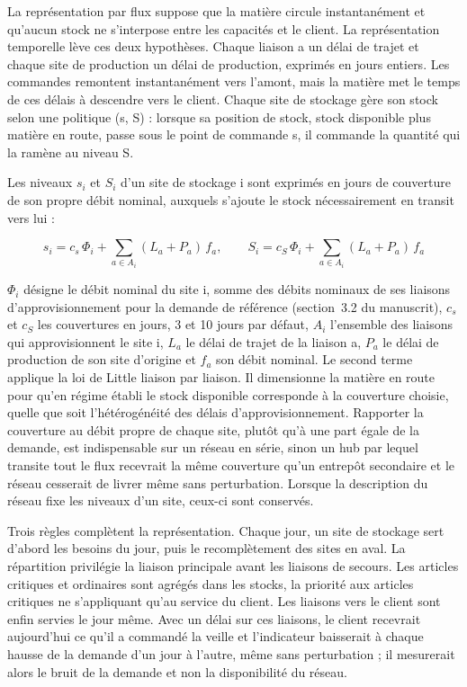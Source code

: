 La représentation par flux suppose que la matière circule instantanément et qu'aucun stock ne s'interpose entre les capacités et le client. La représentation temporelle lève ces deux hypothèses. Chaque liaison a un délai de trajet et chaque site de production un délai de production, exprimés en jours entiers. Les commandes remontent instantanément vers l'amont, mais la matière met le temps de ces délais à descendre vers le client. Chaque site de stockage gère son stock selon une politique (s, S) \citep{scarf1960} : lorsque sa position de stock, stock disponible plus matière en route, passe sous le point de commande s, il commande la quantité qui la ramène au niveau S.

Les niveaux $s_{i}$ et $S_{i}$ d'un site de stockage i sont exprimés en jours de couverture de son propre débit nominal, auxquels s'ajoute le stock nécessairement en transit vers lui :

\begin{equation}
s_i = c_s\,\Phi_i + \sum_{a \in A_i} (L_a + P_a)\, f_a, \qquad S_i = c_S\,\Phi_i + \sum_{a \in A_i} (L_a + P_a)\, f_a
\label{eq:S1}
\end{equation}

$\Phi_{i}$ désigne le débit nominal du site i, somme des débits nominaux de ses liaisons d'approvisionnement pour la demande de référence (section~3.2 du manuscrit), $c_{s}$ et $c_{S}$ les couvertures en jours, 3 et 10 jours par défaut, $A_{i}$ l'ensemble des liaisons qui approvisionnent le site i, $L_{a}$ le délai de trajet de la liaison a, $P_{a}$ le délai de production de son site d'origine et $f_{a}$ son débit nominal. Le second terme applique la loi de Little \citep{little1961} liaison par liaison. Il dimensionne la matière en route pour qu'en régime établi le stock disponible corresponde à la couverture choisie, quelle que soit l'hétérogénéité des délais d'approvisionnement. Rapporter la couverture au débit propre de chaque site, plutôt qu'à une part égale de la demande, est indispensable sur un réseau en série, sinon un hub par lequel transite tout le flux recevrait la même couverture qu'un entrepôt secondaire et le réseau cesserait de livrer même sans perturbation. Lorsque la description du réseau fixe les niveaux d'un site, ceux-ci sont conservés.

Trois règles complètent la représentation. Chaque jour, un site de stockage sert d'abord les besoins du jour, puis le recomplètement des sites en aval. La répartition privilégie la liaison principale avant les liaisons de secours. Les articles critiques et ordinaires sont agrégés dans les stocks, la priorité aux articles critiques ne s'appliquant qu'au service du client. Les liaisons vers le client sont enfin servies le jour même. Avec un délai sur ces liaisons, le client recevrait aujourd'hui ce qu'il a commandé la veille et l'indicateur baisserait à chaque hausse de la demande d'un jour à l'autre, même sans perturbation ; il mesurerait alors le bruit de la demande et non la disponibilité du réseau.

